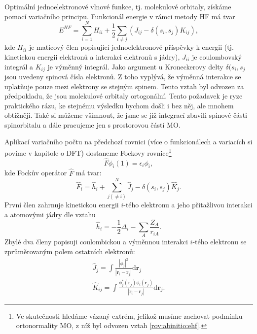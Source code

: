 Optimální jednoelektronové vlnové funkce, tj. molekulové orbitaly, získáme pomocí variačního principu. Funkcionál energie v rámci metody HF má tvar 
\begin{equation}
E^{HF}= \sum_{i=1}^N H_{ii}+ \frac{1}{2}\sum_{i\neq j} (J_{ij}-\delta(s_{i},s_{j})K_{ij}),
\label{rov:abinitio:ehf}
\end{equation}
kde $H_{ii}$ je maticový člen popisující jednoelektronové příspěvky k energii (tj. kinetickou energii elektronů a interakci elektronů s jádry), $J_{ii}$ je coulombovský integrál a $K_{ij}$ je výměnný integrál.
Jako argument u Kroneckerovy delty $\delta(s_{i},s_{j}$ jsou uvedeny spinová čísla elektronů. Z toho vyplývá, že výměnná interakce se uplatňuje pouze mezi elektrony se stejným spinem.
Tento vztah byl odvozen za předpokladu, že jsou molekulové orbitaly ortogonální. Tento požadavek je ryze praktického rázu, ke stejnému výsledku bychom došli i bez něj, ale mnohem obtížněji. Také si můžeme všimnout, že jsme se již integrací zbavili spinové části spinorbitalu a dále pracujeme jen s prostorovou částí MO.

Aplikací variačního počtu na předchozí rovnici (více o funkcionálech a variacích si povíme v kapitole o DFT) dostaneme Fockovy rovnice\footnote{Ve skutečnosti hledáme vázaný extrém, jelikož musíme zachovat podmínku ortonormality MO, z níž byl odvozen vztah \ref{rov:abinitio:ehf}.} 
\begin{equation}
\hat{F}\phi_i(1) = \epsilon_i \phi_i ,
\label{rov:abinitio:fockrov}  
\end{equation}
kde Fockův operátor $\hat{F}$ má tvar:
\begin{equation}
\hat{F}_i = \hat{h}_i+\sum^N_{j(\neq i)} \hat{J}_j - \delta(s_i,s_j) \hat{K}_j .
\label{rov:abinitio:fockoper}
\end{equation}
První člen zahrnuje  kinetickou energii $i$-tého elektronu a jeho přitažlivou interakci a atomovými jádry dle vztahu
\begin{equation}
\hat{h}_i = -\frac{1}{2}\Delta_i - \sum_{A}\frac{Z_A}{r_{iA}} .
\end{equation}
Zbylé dva členy popisuji coulombickou a výměnnou interakci $i$-tého elektronu se zprůměrovaným polem ostatních elektronů:
\begin{eqnarray}
\hat{J}_j=\int \frac{|\phi_j |^2}{|\textbf{r}_{i}-\textbf{r}_{j}|}\mathrm{d}\textbf{r}_j \\
\hat{K}_{ij} = \int \frac{\phi_j^*(\mathbf{r}_j)\phi_i(\mathbf{r}_j)}{|\textbf{r}_{i}-\textbf{r}_{j}|}\mathrm{d}\textbf{r}_j .
\end{eqnarray}

